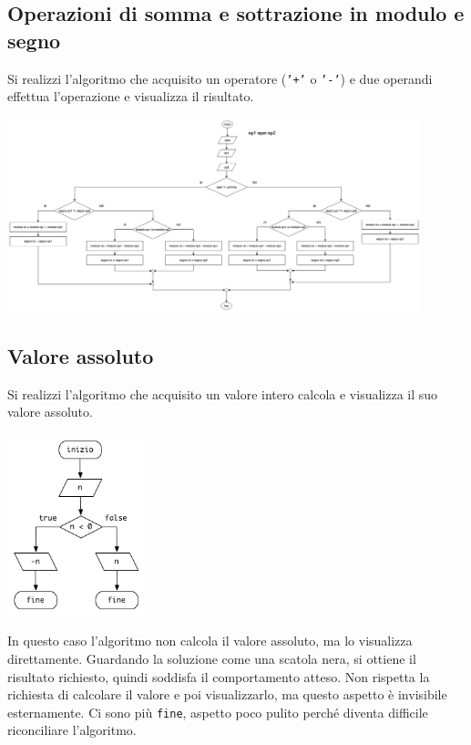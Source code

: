 \subsection{Operazioni di somma e sottrazione in modulo e segno}
Si realizzi l'algoritmo che acquisito un operatore (\texttt{'+'} o \texttt{'-'}) e due operandi effettua l'operazione e visualizza il risultato.

\begin{center}
    \includegraphics[width=0.9\textwidth]{./sommamodulosegno.png}
\end{center}


\subsection{Valore assoluto}
Si realizzi l'algoritmo che acquisito un valore intero calcola e visualizza il suo valore assoluto.

\begin{center}
    \includegraphics[width=0.3\textwidth]{./abs-alg1.png}
\end{center}

In questo caso l'algoritmo non calcola il valore assoluto, ma lo visualizza direttamente. Guardando la soluzione come una scatola nera, si ottiene il risultato richiesto, quindi soddisfa il comportamento atteso. Non rispetta la richiesta di calcolare il valore e poi visualizzarlo, ma questo aspetto \`e invisibile esternamente.
Ci sono pi\`u \texttt{fine}, aspetto poco pulito perch\'e diventa difficile riconciliare l'algoritmo.

